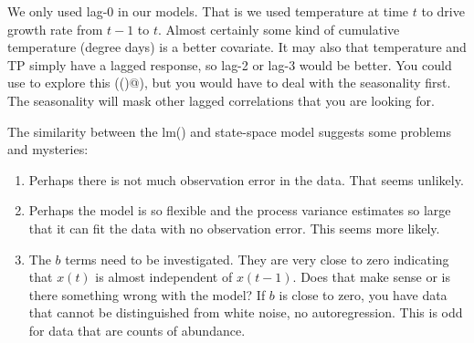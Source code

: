 We only used lag-0 in our models.  That is we used temperature at time $t$ to drive growth rate from $t-1$ to $t$.  Almost certainly some kind of cumulative temperature (degree days) is a better covariate.  It may also that temperature and TP simply have a lagged response, so lag-2 or lag-3 would be better.  You could use to explore this (\verb@ccf()@), but you would have to deal with the seasonality first.  The seasonality will mask other lagged correlations that you are looking for.

The similarity between the lm() and state-space model suggests some problems and mysteries:
\begin{enumerate}
\item Perhaps there is not much observation error in the data.  That seems unlikely.
\item Perhaps the model is so flexible and the process variance estimates so large that it can fit the data with no observation error.  This seems more likely.
\item The $b$ terms need to be investigated.  They are very close to zero indicating that $x(t)$ is almost independent of $x(t-1)$.  Does that make sense or is there something wrong with the model?   If $b$ is close to zero, you have data that cannot be distinguished from white noise, no autoregression.  This is odd for data that are counts of abundance.
\end{enumerate}





